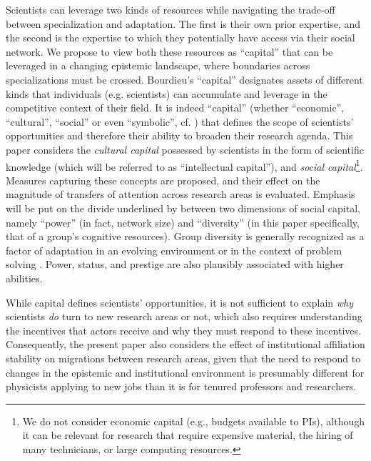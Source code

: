 \documentclass{article}
\begin{document}
Scientists can leverage two kinds of resources while navigating the trade-off between specialization and adaptation. The first is their own prior expertise, and the second is the expertise to which they potentially have access via their social network. We propose to view both these resources as ``capital'' \citep{Bourdieu1986} that can be leveraged in a changing epistemic landscape, where boundaries across specializations must be crossed. Bourdieu's ``capital'' designates assets of different kinds that individuals (e.g. scientists) can accumulate and leverage in the competitive context of their field. It is indeed ``capital''  (whether ``economic'', ``cultural'', ``social'' or even ``symbolic'', cf. \citealt{Bourdieu1986}) that defines the scope of scientists' opportunities and therefore their ability to broaden their research agenda. This paper considers the \textit{cultural capital} possessed by scientists in the form of scientific knowledge (which will be referred to as ``intellectual capital''), and \textit{social capital}\footnote{We do not consider economic capital (e.g., budgets available to PIs), although it can be relevant for research that require expensive material,  the hiring of many technicians, or large computing resources.}. Measures capturing these concepts are proposed, and their effect on the magnitude of transfers of attention across research areas is evaluated. Emphasis will be put on the divide underlined by \citet{Abbasi2014} between two dimensions of social capital, namely ``power'' (in fact, network size) and ``diversity'' (in this paper specifically, that of a group's cognitive resources). Group diversity is generally recognized as a factor of adaptation in an evolving environment \citep{Schimmelpfennig2021,Muthukrishna2016,Henrich2004} or in the context of problem solving \citep{Hong2004}. Power, status, and prestige are also plausibly associated with higher abilities.

While capital defines scientists' opportunities, it is not sufficient to explain \textit{why} scientists \textit{do} turn to new research areas or not, which also requires understanding the incentives that actors receive and why they must respond to these incentives. Consequently, the present paper also considers the effect of institutional affiliation stability on migrations between research areas, given that the need to respond to changes in the epistemic and institutional environment is presumably different for physicists applying to new jobs than it is for tenured professors and researchers.%
\end{document}
